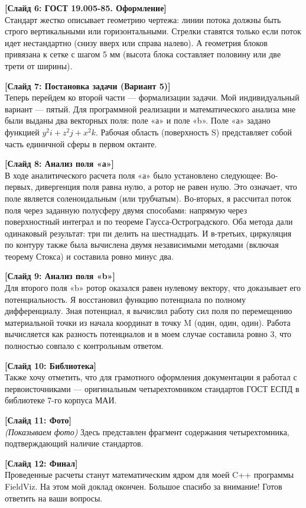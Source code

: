 \documentclass[14pt,a4paper]{extarticle}
\begin{document}
\vspace{0.5cm}
\textbf{[Слайд 6: ГОСТ 19.005-85. Оформление]} \\
Стандарт жестко описывает геометрию чертежа: линии потока должны быть строго вертикальными или горизонтальными. Стрелки ставятся только если поток идет нестандартно (снизу вверх или справа налево). А геометрия блоков привязана к сетке с шагом 5 мм (высота блока составляет половину или две трети от ширины).

\vspace{0.5cm}
\textbf{[Слайд 7: Постановка задачи (Вариант 5)]} \\
Теперь перейдем ко второй части — формализации задачи.
Мой индивидуальный вариант — пятый. Для программной реализации и математического анализа мне были выданы два векторных поля: поле «а» и поле «b».
Поле «а» задано функцией $y^2 i + z^2 j + x^2 k$.
Рабочая область (поверхность S) представляет собой часть единичной сферы в первом октанте.

\vspace{0.5cm}
\textbf{[Слайд 8: Анализ поля «а»]} \\
В ходе аналитического расчета поля «а» было установлено следующее:
Во-первых, дивергенция поля равна нулю, а ротор не равен нулю. Это означает, что поле является соленоидальным (или трубчатым).
Во-вторых, я рассчитал поток поля через заданную полусферу двумя способами: напрямую через поверхностный интеграл и по теореме Гаусса-Остроградского. Оба метода дали одинаковый результат: три пи делить на шестнадцать.
И в-третьих, циркуляция по контуру также была вычислена двумя независимыми методами (включая теорему Стокса) и составила ровно минус два.

\vspace{0.5cm}
\textbf{[Слайд 9: Анализ поля «b»]} \\
Для второго поля «b» ротор оказался равен нулевому вектору, что доказывает его потенциальность.
Я восстановил функцию потенциала по полному дифференциалу.
Зная потенциал, я вычислил работу сил поля по перемещению материальной точки из начала координат в точку M (один, один, один). Работа вычисляется как разность потенциалов и в моем случае составила ровно 3, что полностью совпало с контрольным ответом.

\vspace{0.5cm}
\textbf{[Слайд 10: Библиотека]} \\
Также хочу отметить, что для грамотного оформления документации я работал с первоисточниками — оригинальным четырехтомником стандартов ГОСТ ЕСПД в библиотеке 7-го корпуса МАИ. 

\vspace{0.5cm}
\textbf{[Слайд 11: Фото]} \\
\textit{(Показываем фото)} Здесь представлен фрагмент содержания четырехтомника, подтверждающий наличие стандартов.

\vspace{0.5cm}
\textbf{[Слайд 12: Финал]} \\
Проведенные расчеты станут математическим ядром для моей C++ программы FieldViz. На этом мой доклад окончен. Большое спасибо за внимание! Готов ответить на ваши вопросы.
\end{document}
